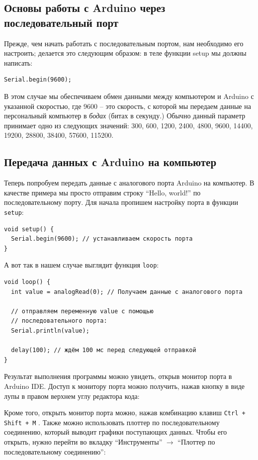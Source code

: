 \documentclass[a4paper,twoside]{book}
\newcommand{\hotkey}[1]{
  \texttt{#1}
}
\begin{document}
\subsection{Основы работы с Arduino через последовательный порт}

Прежде, чем начать работать с последовательным портом, нам необходимо его
настроить; делается это следующим образом: в теле функции setup мы должны
написать:

\begin{verbatim}
Serial.begin(9600);
\end{verbatim}

В этом случае мы обеспечиваем обмен данными между компьютером и Arduino с
указанной скоростью, где 9600 -- это скорость, с которой мы передаем данные на
персональный компьютер в \emph{бодах} (битах в секунду.) Обычно данный параметр
принимает одно из следующих значений: 300, 600, 1200, 2400, 4800, 9600, 14400,
19200, 28800, 38400, 57600, 115200.

\subsection{Передача данных с Arduino на компьютер}

Теперь попробуем передать данные с аналогового порта Arduino на компьютер. В
качестве примера мы просто отправим строку ``Hello, world!'' по
последовательному порту. Для начала пропишем настройку порта в функции
\texttt{setup}:

\begin{verbatim}
void setup() {
  Serial.begin(9600); // устанавливаем скорость порта
}
\end{verbatim}

А вот так в нашем случае выглядит функция \texttt{loop}:

\begin{verbatim}
void loop() {
  int value = analogRead(0); // Получаем данные с аналогового порта

  // отправляем переменную value с помощью
  // последовательного порта:
  Serial.println(value);

  delay(100); // ждём 100 мс перед следующей отправкой
}
\end{verbatim}

Результат выполнения программы можно увидеть, открыв монитор порта в Arduino
IDE. Доступ к монитору порта можно получить, нажав кнопку в виде лупы в правом
верхнем углу редактора кода:

Кроме того, открыть монитор порта можно, нажав комбинацию клавиш \hotkey{Ctrl +
  Shift + M}. Также можно использовать плоттер по последовательному соединению,
который выводит графики поступающих данных. Чтобы его открыть, нужно перейти во
вкладку ``Инструменты'' $\rightarrow$ ``Плоттер по последовательному
соединению'':
\end{document}
